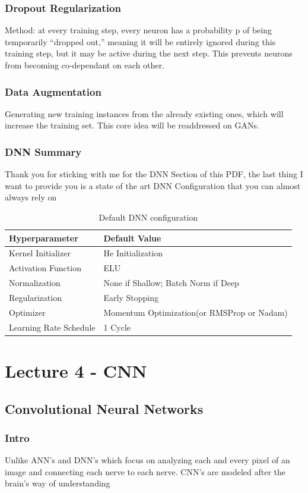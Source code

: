 \documentclass[article]{llncs}
\begin{document}
\subsubsection{Dropout Regularization}
Method: at every training step, every neuron has a probability p of being temporarily “dropped out,” meaning it will be entirely ignored during this training step, but it may be active during the next step. This prevents neurons from becoming co-dependant on each other.
\subsubsection{Data Augmentation}
Generating new training instances from the already existing ones, which will increase the training set. This core idea will be readdressed on GANs.
\subsubsection{DNN Summary}Thank you for sticking with me for the DNN Section of this PDF, the last thing I want to provide you is a state of the art DNN Configuration that you can almost always rely on

\begin{table}[H]
\caption{Default DNN configuration}\label{tab1}
\begin{tabular}{|l|l|}
\hline
Hyperparameter & Default Value \\
\hline
Kernel Initializer &  He Initialization\\
\hline
Activation Function &  ELU \\
\hline
Normalization & None if Shallow; Batch Norm if Deep\\
\hline
Regularization & Early Stopping\\
\hline
Optimizer &  Momentum Optimization(or RMSProp or Nadam)\\
\hline
Learning Rate Schedule & 1 Cycle\\
\hline
\end{tabular}
\end{table}

\section{Lecture 4 - CNN}

\subsection{Convolutional Neural Networks}

\subsubsection{Intro}

Unlike ANN's and DNN's which focus on analyzing each and every pixel of an image and connecting each nerve to each nerve. CNN's are modeled after the brain's way of understanding 
\end{document}
